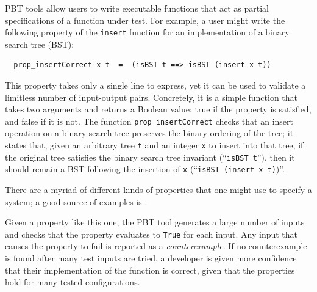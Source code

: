 
PBT tools allow users to write executable functions
that act as partial
specifications of a function under test. For example, a user might
write the following property of the \lstinline{insert}
function for an implementation of a binary search tree (BST):
\begin{lstlisting}
  prop_insertCorrect x t  =  (isBST t ==> isBST (insert x t))
\end{lstlisting}
This property takes only a single
line to express, yet it can be used to validate a limitless number of
input-output pairs. Concretely, it is
a simple function that takes two arguments and returns a
Boolean value: true if the property is satisfied, and false if it is
not. The function \texttt{prop\_insertCorrect} checks
that an insert operation on a binary search tree preserves the
binary ordering of the tree; it states
that, given an arbitrary tree \texttt{t} and an integer
\texttt{x} to insert into that tree, if the original tree
satisfies the
binary search tree invariant (``\texttt{isBST t}''), then it should remain
a BST following the insertion of \texttt{x} (``\texttt{isBST (insert x t)})''.

\iflater {}There are a
myriad of different kinds of properties that one might use to specify
a system; a good source of examples is \citet{HowToSpecifyIt}.  \fi

Given a property like this one, the PBT tool generates a large number of inputs and
checks that the property evaluates to \lstinline{True} for each input.
Any input that causes the property to fail is reported as a {\em
counterexample}. If no counterexample is found after many test
inputs are tried, a developer is given more confidence that their implementation
of the function is correct, given that the properties hold for many
tested configurations.


